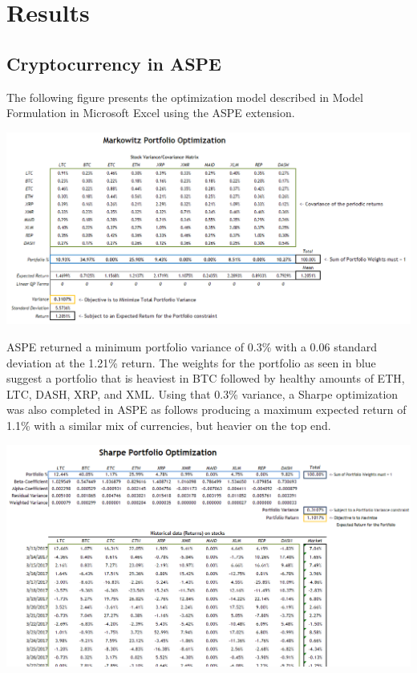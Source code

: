 \documentclass[12pt]{article} %
\begin{document}
\section{Results}

\subsection{Cryptocurrency in ASPE}

The following figure presents the optimization model described in Model Formulation in Microsoft Excel using the ASPE extension.

\includegraphics[width=\textwidth]{aspe1}

ASPE returned a minimum portfolio variance of 0.3\% with a 0.06 standard deviation at the 1.21\% return.  The weights for the portfolio as seen in blue suggest a portfolio that is heaviest in BTC followed by healthy amounts of ETH, LTC, DASH, XRP, and XML.  Using that 0.3\% variance, a Sharpe optimization was also completed in ASPE as follows producing a maximum expected return of 1.1\% with a similar mix of currencies, but heavier on the top end.

\includegraphics[width=\textwidth]{aspe3}
\end{document}
